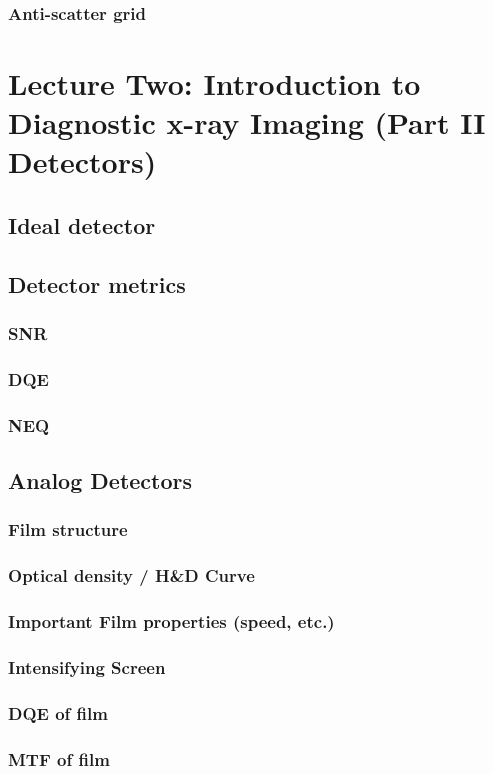 \documentclass[11pt]{article}
\begin{document}
\subsubsection{Anti-scatter grid}

\newpage
\section{Lecture Two: Introduction to Diagnostic x-ray Imaging (Part II Detectors)}
\subsection{Ideal detector}
\subsection{Detector metrics}
\subsubsection{SNR}
\subsubsection{DQE}
\subsubsection{NEQ}
\subsection{Analog Detectors}
\subsubsection{Film structure}
\subsubsection{Optical density / H\&D Curve}
\subsubsection{Important Film properties (speed, etc.)}
\subsubsection{Intensifying Screen}
\subsubsection{DQE of film}
\subsubsection{MTF of film}
\end{document}
